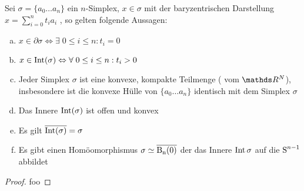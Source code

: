 \begin{Satz}
  \normalfont Sei $\sigma = \{ a_0 \ldots a_n \}$ ein $n$-Simplex,
  $x \in \sigma$ mit der baryzentrischen Darstellung
  $x=\sum\limits_{i=0}^n t_i a_i$ , so gelten folgende Aussagen:
  \begin{enumerate}[(a)]
  \item
    $x \in \partial\sigma \Leftrightarrow \exists \; 0 \leq i \leq n :
    t_i = 0$
  \item
    $x \in \operatorname{Int}(\sigma) \Leftrightarrow \forall \; 0 \leq i \leq n :
    t_i > 0$
  \item Jeder Simplex $\sigma$ ist eine konvexe, kompakte Teilmenge (
    vom $\R^N$), insbesondere ist die konvexe Hülle von
    $\{ a_0 \ldots a_n \}$ identisch mit dem Simplex $\sigma$
  \item Das Innere $\operatorname{Int}(\sigma)$ ist offen und konvex
  \item Es gilt $\overline{\operatorname{Int}(\sigma)} = \sigma$
  \item Es gibt einen Homöomorphismus $\sigma \simeq \operatorname{\overline{\operatorname{B}_n(0)}}$ der das
    Innere $\operatorname{Int}{\sigma}$ auf die $\operatorname{S}^{n-1}$ abbildet
  \end{enumerate}
  \begin{proof}
    foo
  \end{proof}
\end{Satz}








